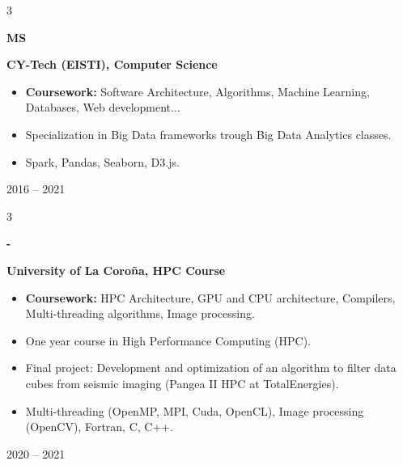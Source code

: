 \documentclass[10pt, letterpaper]{article}
\newenvironment{highlights}{
    \begin{itemize}[
        topsep=0.10 cm,
        parsep=0.10 cm,
        partopsep=0pt,
        itemsep=0pt,
        leftmargin=0.4 cm + 10pt
    ]
}{
    \end{itemize}
} %
\newenvironment{twocolentry}[2][]{
    \onecolentry
    \def\secondColumn{#2}
    \setcolumnwidth{\fill, 6 cm}
    \begin{paracol}{2}
}{
    \switchcolumn \raggedleft \secondColumn
    \end{paracol}
    \endonecolentry
} %
\newenvironment{threecolentry}[3][]{
    \onecolentry
    \def\thirdColumn{#3}
    \setcolumnwidth{1 cm, \fill, 4.5 cm}
    \begin{paracol}{3}
    {\raggedright #2} \switchcolumn
}{
    \switchcolumn \raggedleft \thirdColumn
    \end{paracol}
    \endonecolentry
} %
\let\hrefWithoutArrow\href
\renewcommand{\href}[2]{\hrefWithoutArrow{#1}{\ifthenelse{\equal{#2}{}}{ }{#2 }\raisebox{.15ex}{\footnotesize \faExternalLink*}}}
\begin{document}
        \begin{threecolentry}{\textbf{MS}}{
            \color{secondaryColor}2016 – 2021
        }
            \textbf{CY-Tech (EISTI), Computer Science}
            \begin{highlights}
                \item \textbf{Coursework:} Software Architecture, Algorithms, Machine Learning, Databases, Web development...
                \item Specialization in Big Data frameworks trough Big Data Analytics classes.
                \item Spark, Pandas, Seaborn, D3.js.
            \end{highlights}
        \end{threecolentry}

        \begin{threecolentry}{\textbf{-}}{
            \color{secondaryColor}2020 – 2021
        }
            \textbf{University of La Coroña, HPC Course}
            \begin{highlights}
                \item \textbf{Coursework:} HPC Architecture, GPU and CPU architecture, Compilers, Multi-threading algorithms, Image processing.
                \item One year course in High Performance Computing (HPC).
                \item Final project: Development and optimization of an algorithm to filter data cubes from seismic imaging (Pangea II HPC at TotalEnergies).
                \item Multi-threading (OpenMP, MPI, Cuda, OpenCL), Image processing (OpenCV), Fortran, C, C++.
            \end{highlights}
        \end{threecolentry}

    
\end{document}
